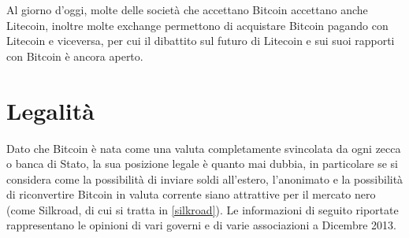 Al giorno d'oggi, molte delle società che accettano Bitcoin accettano anche Litecoin, inoltre molte exchange permettono di acquistare Bitcoin pagando con Litecoin e viceversa, per cui il dibattito sul futuro di Litecoin e sui suoi rapporti con Bitcoin è ancora aperto.

\section{Legalità}

Dato che Bitcoin è nata come una valuta completamente svincolata da ogni zecca o banca di Stato, la sua posizione legale è quanto mai dubbia, in particolare se si considera come la possibilità di inviare soldi all'estero, l'anonimato e la possibilità di riconvertire Bitcoin in valuta corrente siano attrattive per il mercato nero (come Silkroad, di cui si tratta in \ref{silkroad}). Le informazioni di seguito riportate rappresentano le opinioni di vari governi e di varie associazioni a Dicembre 2013.
